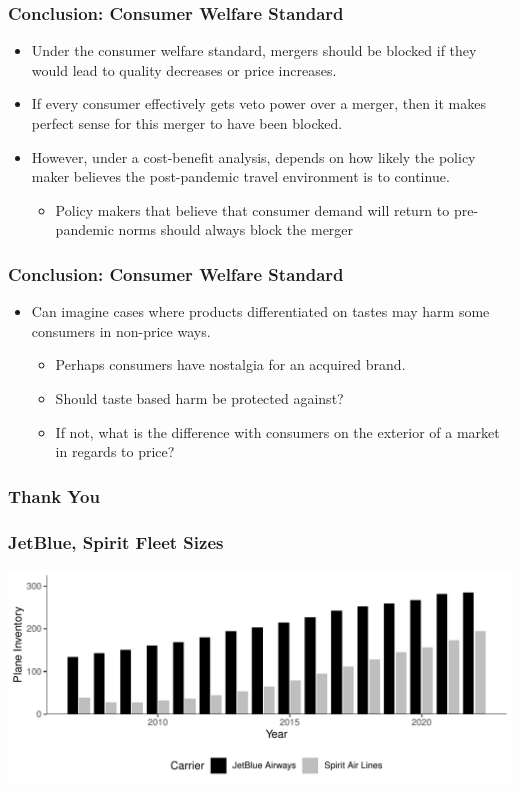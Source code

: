 \documentclass[xcolor=dvipsnames]{beamer}
\begin{document}
    \begin{frame}
        \frametitle{Conclusion: Consumer Welfare Standard}
        \begin{itemize}
            \item Under the consumer welfare standard, mergers should be blocked if they would lead to quality decreases or price increases.
            \item If every consumer effectively gets veto power over a merger, then it makes perfect sense for this merger to have been blocked.
            \item However, under a cost-benefit analysis, depends on how likely the policy maker believes the post-pandemic travel environment is to continue.
            \begin{itemize}
                \item Policy makers that believe that consumer demand will return to pre-pandemic norms should always block the merger
            \end{itemize}
        \end{itemize}
    \end{frame}

    \begin{frame}
        \frametitle{Conclusion: Consumer Welfare Standard}
        \begin{itemize}
            \item Can imagine cases where products differentiated on tastes may harm some consumers in non-price ways.
            \begin{itemize}
                \item Perhaps consumers have nostalgia for an acquired brand.
                \item Should taste based harm be protected against?
                \item If not, what is the difference with consumers on the exterior of a market in regards to price?
            \end{itemize}
        \end{itemize}
    \end{frame}

	\begin{frame}
		\frametitle{Thank You}
	\end{frame}

    \printbibliography
%	

 \begin{frame}
        \frametitle{JetBlue, Spirit Fleet Sizes}
        \includegraphics[width = \linewidth]{Both_Planes.pdf}
    \end{frame}
\end{document}
